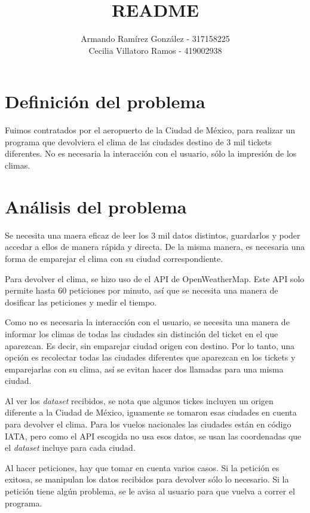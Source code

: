 \documentclass[]{article}
\title{README}
\author{Armando Ramírez González - 317158225 \\ Cecilia Villatoro Ramos - 
419002938}
\begin{document}
\maketitle

\section{Definición del problema}

Fuimos contratados por el aeropuerto de la Ciudad de México, para realizar un programa que devolviera el clima de las ciudades destino de 3 mil tickets diferentes. No es necesaria la interacción con el usuario, sólo la impresión de los climas.

\section{Análisis del problema}

Se necesita una maera eficaz de leer los 3 mil datos distintos, guardarlos y 
poder accedar a ellos de manera rápida y directa. De la misma manera, es 
necesaria una forma de emparejar el clima con su ciudad correspondiente.

Para devolver el clima, se hizo uso de el API de OpenWeatherMap. Este API
solo permite hasta 60 peticiones por minuto, así que se necesita una 
manera de dosificar las peticiones y medir el tiempo.

Como no es necesaria la interacción con el usuario, se necesita 
una manera de informar los climas de todas las ciudades sin distinción del 
ticket en el que aparezcan. Es decir, sin emparejar ciudad origen con 
destino. Por lo tanto, una opción es recolectar todas las ciudades 
diferentes que aparezcan en los tickets y emparejarlas con su clima, así 
se evitan hacer dos llamadas para una misma ciudad.

Al ver los \emph{dataset} recibidos, se nota que algunos tickes incluyen 
un origen diferente a la Ciudad de México, iguamente se tomaron esas 
ciudades en cuenta para devolver el clima. Para los vuelos nacionales las 
ciudades están en código IATA, pero como el API escogida no usa esos 
datos, se usan las coordenadas que el \emph{dataset} incluye para cada 
ciudad. 

Al hacer peticiones, hay que tomar en cuenta varios casos. Si la petición 
es exitosa, se manipulan los datos recibidos para devolver sólo lo 
necesario. Si la petición tiene algún problema, se le avisa al usuario para 
que vuelva a correr el programa. 
\end{document}
